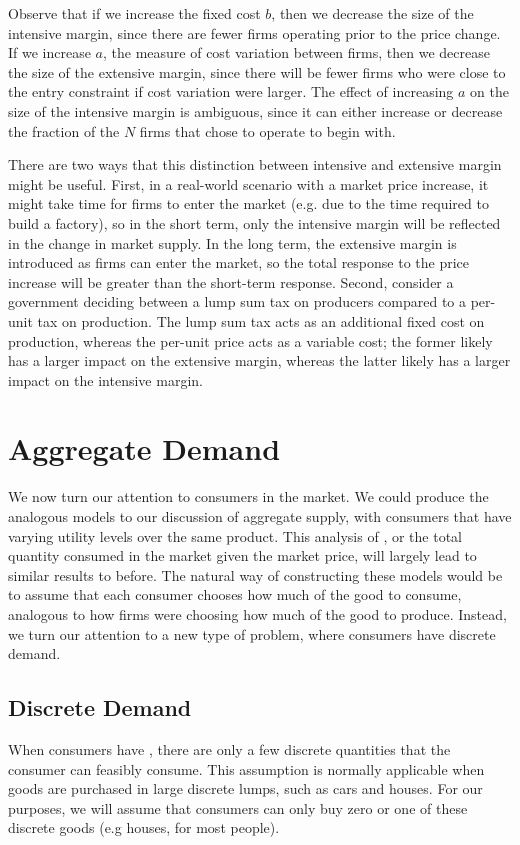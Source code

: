 Observe that if we increase the fixed cost $b$, then we decrease the size of the intensive margin, since there are fewer firms operating prior to the price change. If we increase $a$, the measure of cost variation between firms, then we decrease the size of the extensive margin, since there will be fewer firms who were close to the entry constraint if cost variation were larger. The effect of increasing $a$ on the size of the intensive margin is ambiguous, since it can either increase or decrease the fraction of the $N$ firms that chose to operate to begin with.

There are two ways that this distinction between intensive and extensive margin might be useful. First, in a real-world scenario with a market price increase, it might take time for firms to enter the market (e.g. due to the time required to build a factory), so in the short term, only the intensive margin will be reflected in the change in market supply. In the long term, the extensive margin is introduced as firms can enter the market, so the total response to the price increase will be greater than the short-term response. Second, consider a government deciding between a lump sum tax on producers compared to a per-unit tax on production. The lump sum tax acts as an additional fixed cost on production, whereas the per-unit price acts as a variable cost; the former likely has a larger impact on the extensive margin, whereas the latter likely has a larger impact on the intensive margin.

\section{Aggregate Demand}
We now turn our attention to consumers in the market. We could produce the analogous models to our discussion of aggregate supply, with consumers that have varying utility levels over the same product. This analysis of , or the total quantity consumed in the market given the market price, will largely lead to similar results to before. The natural way of constructing these models would be to assume that each consumer chooses how much of the good to consume, analogous to how firms were choosing how much of the good to produce. Instead, we turn our attention to a new type of problem, where consumers have discrete demand.

\subsection*{Discrete Demand}
When consumers have , there are only a few discrete quantities that the consumer can feasibly consume. This assumption is normally applicable when goods are purchased in large discrete lumps, such as cars and houses. For our purposes, we will assume that consumers can only buy zero or one of these discrete goods (e.g houses, for most people).

